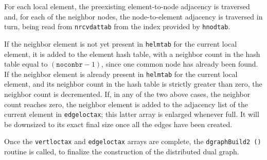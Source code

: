 For each local element, the preexisting element-to-node adjacency is
traversed and, for each of the neighbor nodes, the node-to-element
adjacency is traversed in turn, being read from
\texttt{nrcv\lbt dat\lbt tab} from the index provided by
\texttt{hnodtab}.

If the neighbor element is not yet present in \texttt{helmtab} for the
current local element, it is added to the element hash table, with a
neighbor count in the hash table equal to $(\texttt{noconbr} - 1)$,
since one common node has already been found. If the neighbor element
is already present in \texttt{helmtab} for the current local element,
and its neighbor count in the hash table is strictly greater than
zero, the neighbor count is decremented. If, in any of the two above
cases, the neighbor count reaches zero, the neighbor element is added
to the adjacency list of the current element in
\texttt{edge\lbt loc\lbt tax}; this latter array is enlarged whenever
full. It will be downsized to its exact final size once all the edges
have been created.

Once the \texttt{vert\lbt loc\lbt tax} and
\texttt{edge\lbt loc\lbt tax} arrays are complete, the
\texttt{dgraphBuild2\,()} routine is called, to finalize the
construction of the distributed dual graph.
